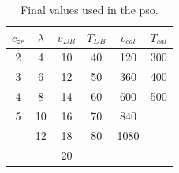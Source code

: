 \begin{table}[ht!]
	\centering
	\caption{Final values used in the \gls{pso}.}
    \label{tab:space}
    \begin{tabular}{cccccc}
        \hline\hline
		$c_{zr}$	&$\lambda$	&$v_{DB}$	&$T_{DB}$	&$v_{cal}$	&$T_{cal}$		\\
        \hline
        2   &4  &10 &40 &120    &300    \\
        3   &6  &12 &50 &360    &400    \\
        4   &8  &14 &60 &600    &500    \\
        5   &10 &16 &70 &840    &       \\
            &12 &18 &80 &1080   &       \\
            &   &20 &   &       &       \\
        \hline\hline
    \end{tabular}
\end{table}


